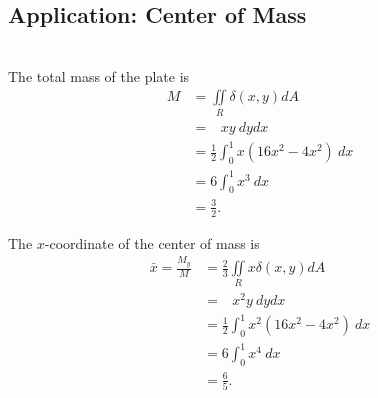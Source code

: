 \subsection{Application: Center of Mass}
\BEN
\item %
 \\
The total mass of the plate is
\begin{align*}
  M 
  &= \iint\limits_R \delta(x,y) dA \\
  &=    \mathop{\int_0^1 \!\! \int_{2x}^{4x} } xy \ dydx \\
  &=  \frac{1}{2}  \int_0^1 x(16x^2 - 4x^2) \ dx \\
  &= 6  \int_0^1 x^3 \ dx \\
  &=   \frac{3}{2}.
\end{align*}

The $x$-coordinate of the center of mass is
\begin{align*}
  \bar{x} = \frac{M_y}{M} 
  &= \frac{2}{3} \iint\limits_R x \delta(x,y) dA \\
  &=    \mathop{\int_0^1 \!\! \int_{2x}^{4x} } x^2y \ dydx \\
  &=  \frac{1}{2}  \int_0^1 x^2(16x^2 - 4x^2) \ dx \\
  &= 6  \int_0^1 x^4 \ dx \\
  &=   \frac{6}{5}.
\end{align*}

